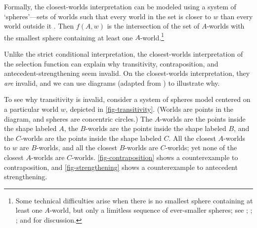 Formally, the closest-worlds interpretation can be modeled using a system of `spheres'---sets of worlds such that every world in the set is closer to $w$ than every world outside it \citep{lewis-counterfactuals}. Then $f(A, w)$ is the intersection of the set of $A$-worlds with the smallest sphere containing at least one $A$-world.\footnote{Some technical difficulties arise when there is no smallest sphere containing at least one $A$-world, but only a limitless sequence of ever-smaller spheres; see \citet[424--425]{Lewis1973-LEWCAC}; \citet[96--99]{Stalnaker1981-STAADO-4}; \citet{Warmbrod1982-WARADO}; and \citet{Diez2015-DEZCTD} for discussion.}

Unlike the strict conditional interpretation, the closest-worlds interpretation of the selection function can explain why transitivity, contraposition, and antecedent-strengthening seem invalid.  On the closest-worlds interpretation, they \emph{are} invalid, and we can use diagrams (adapted from \citealp{lewis-counterfactuals}) to illustrate why.

To see why transitivity is invalid, consider a system of spheres model centered on a particular world $w$, depicted in \autoref{fig-transitivity}.  (Worlds are points in the diagram, and spheres are concentric circles.)  The $A$-worlds are the points inside the shape labeled $A$, the $B$-worlds are the points inside the shape labeled $B$, and the $C$-worlds are the points inside the shape labeled $C$.  All the closest $A$-worlds to $w$ are $B$-worlds, and all the closest $B$-worlds are $C$-worlds; yet none of the closest $A$-worlds are $C$-worlds.  \autoref{fig-contraposition} shows a counterexample to contraposition, and \autoref{fig-strengthening} shows a counterexample to antecedent strengthening.


